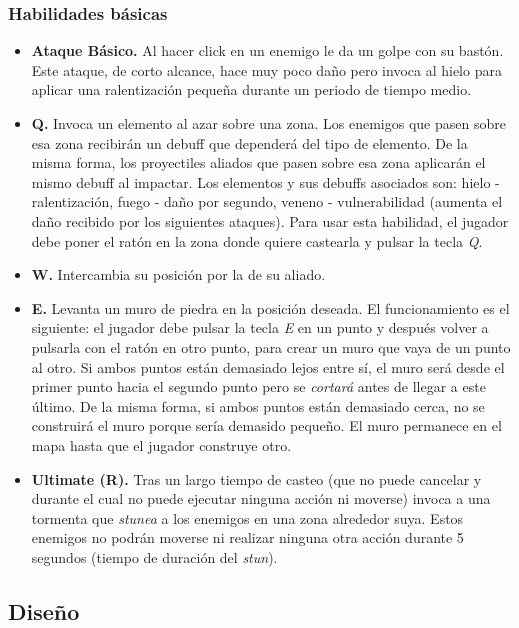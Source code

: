 \subsubsection{Habilidades básicas}
\begin{itemize}
\item \textbf{Ataque Básico.} Al hacer click en un enemigo le da un golpe con su bastón. Este ataque, de corto alcance, hace muy poco daño pero invoca al hielo para aplicar una ralentización pequeña durante un periodo de tiempo medio.
\item \textbf{Q.} Invoca un elemento al azar sobre una zona. Los enemigos que pasen sobre esa zona recibirán un debuff que dependerá del tipo de elemento. De la misma forma, los proyectiles aliados que pasen sobre esa zona aplicarán el mismo debuff al impactar. Los elementos y sus debuffs asociados son: hielo - ralentización, fuego - daño por segundo, veneno - vulnerabilidad (aumenta el daño recibido por los siguientes ataques). Para usar esta habilidad, el jugador debe poner el ratón en la zona donde quiere castearla y pulsar la tecla \emph{Q}.
\item \textbf{W.} Intercambia su posición por la de su aliado.
\item \textbf{E.} Levanta un muro de piedra en la posición deseada. El funcionamiento es el siguiente: el jugador debe pulsar la tecla \emph{E} en un punto y después volver a pulsarla con el ratón en otro punto, para crear un muro que vaya de un punto al otro. Si ambos puntos están demasiado lejos entre sí, el muro será desde el primer punto hacia el segundo punto pero se \emph{cortará} antes de llegar a este último. De la misma forma, si ambos puntos están demasiado cerca, no se construirá el muro porque sería demasido pequeño. El muro permanece en el mapa hasta que el jugador construye otro.
\item \textbf{Ultimate (R).} Tras un largo tiempo de casteo (que no puede cancelar y durante el cual no puede ejecutar ninguna acción ni moverse) invoca a una tormenta que \emph{stunea} a los enemigos en una zona alrededor suya. Estos enemigos no podrán moverse ni realizar ninguna otra acción durante 5 segundos (tiempo de duración del \emph{stun}).
\end{itemize}

\subsection{Diseño}

